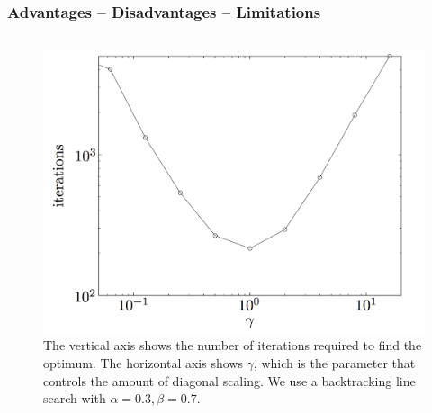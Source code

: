 \begin{frame}
  \frametitle{Advantages -- Disadvantages -- Limitations}




\vspace{-4mm}


\begin{columns}
  \begin{column}{0.5\textwidth}
    \begin{figure}[ht!]
      \centering
\includegraphics[scale=0.15]{pics/ga1.png}
\caption{\tiny The
  vertical axis shows the number of iterations required to find the
  optimum. The
  horizontal axis shows $\gamma$, which is the  parameter that controls the amount of diagonal scaling. We use a
backtracking line search with $\alpha = 0.3, \beta = 0.7$.}
    \end{figure}
  \end{column}


\end{columns}
\end{frame}
